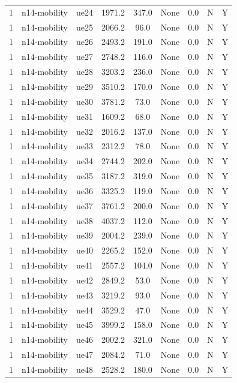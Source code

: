 \begin{table}[ht]
\begin{tabular}{|c|c|c|c|c|c|c|c|c|}
1 & n14-mobility & ue24 & 1971.2 & 347.0 & None & 0.0 & N & Y \\
1 & n14-mobility & ue25 & 2066.2 & 96.0 & None & 0.0 & N & Y \\
1 & n14-mobility & ue26 & 2493.2 & 191.0 & None & 0.0 & N & Y \\
1 & n14-mobility & ue27 & 2748.2 & 116.0 & None & 0.0 & N & Y \\
1 & n14-mobility & ue28 & 3203.2 & 236.0 & None & 0.0 & N & Y \\
1 & n14-mobility & ue29 & 3510.2 & 170.0 & None & 0.0 & N & Y \\
1 & n14-mobility & ue30 & 3781.2 & 73.0 & None & 0.0 & N & Y \\
1 & n14-mobility & ue31 & 1609.2 & 68.0 & None & 0.0 & N & Y \\
1 & n14-mobility & ue32 & 2016.2 & 137.0 & None & 0.0 & N & Y \\
1 & n14-mobility & ue33 & 2312.2 & 78.0 & None & 0.0 & N & Y \\
1 & n14-mobility & ue34 & 2744.2 & 202.0 & None & 0.0 & N & Y \\
1 & n14-mobility & ue35 & 3187.2 & 319.0 & None & 0.0 & N & Y \\
1 & n14-mobility & ue36 & 3325.2 & 119.0 & None & 0.0 & N & Y \\
1 & n14-mobility & ue37 & 3761.2 & 200.0 & None & 0.0 & N & Y \\
1 & n14-mobility & ue38 & 4037.2 & 112.0 & None & 0.0 & N & Y \\
1 & n14-mobility & ue39 & 2004.2 & 239.0 & None & 0.0 & N & Y \\
1 & n14-mobility & ue40 & 2265.2 & 152.0 & None & 0.0 & N & Y \\
1 & n14-mobility & ue41 & 2557.2 & 104.0 & None & 0.0 & N & Y \\
1 & n14-mobility & ue42 & 2849.2 & 53.0 & None & 0.0 & N & Y \\
1 & n14-mobility & ue43 & 3219.2 & 93.0 & None & 0.0 & N & Y \\
1 & n14-mobility & ue44 & 3529.2 & 47.0 & None & 0.0 & N & Y \\
1 & n14-mobility & ue45 & 3999.2 & 158.0 & None & 0.0 & N & Y \\
1 & n14-mobility & ue46 & 2002.2 & 321.0 & None & 0.0 & N & Y \\
1 & n14-mobility & ue47 & 2084.2 & 71.0 & None & 0.0 & N & Y \\
1 & n14-mobility & ue48 & 2528.2 & 180.0 & None & 0.0 & N & Y \\

\end{tabular}
\end{table}
